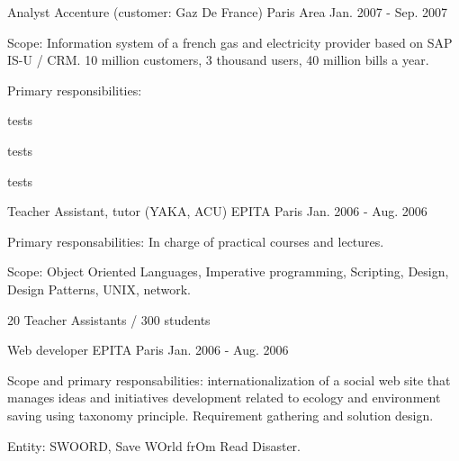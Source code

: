 

\begin{cventries}

  \cventry
    {Analyst} %
    {Accenture (customer: Gaz De France)} %
    {Paris Area} %
    {Jan. 2007 - Sep. 2007} %
    {
      \begin{cvitems} %
        \item {Scope: Information system of a french gas and electricity provider based on SAP IS-U / CRM. 10 million customers, 3 thousand users, 40 million bills a year.}
        \item {Primary responsibilities:}
        \begin{cvsubitems}
          \item {tests}
          \item {tests}
          \item {tests}
        \end{cvsubitems}
      \end{cvitems}
    }

  \cventry
    {Teacher Assistant, tutor (YAKA, ACU)} %
    {EPITA} %
    {Paris} %
    {Jan. 2006 - Aug. 2006} %
    {
      \begin{cvitems} %
        \item {Primary responsabilities: In charge of practical courses and lectures.}
        \item {Scope: Object Oriented Languages, Imperative programming, Scripting, Design, Design Patterns, UNIX, network.}
        \item {20 Teacher Assistants / 300 students}
      \end{cvitems}
    }

  \cventry
    {Web developer} %
    {EPITA} %
    {Paris} %
    {Jan. 2006 - Aug. 2006} %
    {
      \begin{cvitems} %
        \item {Scope and primary responsabilities: internationalization of a social web site that manages ideas and initiatives development related to ecology and environment saving using taxonomy principle. Requirement gathering and solution design.}
        \item {Entity: SWOORD, Save WOrld frOm Read Disaster.}
      \end{cvitems}
    }


\end{cventries}
